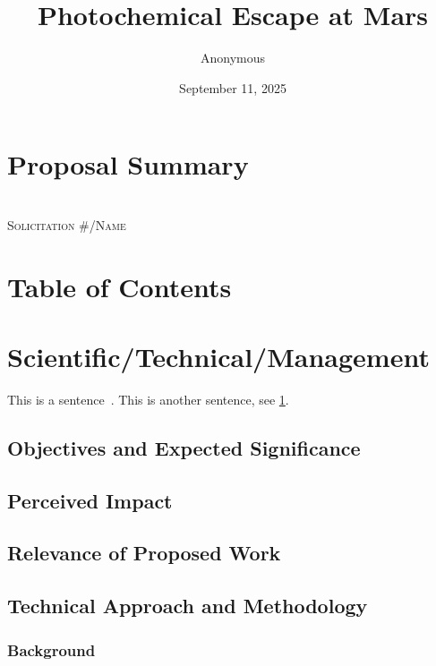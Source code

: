 \documentclass[oneside,12pt]{article}
\author{Anonymous}
\title{Photochemical Escape at Mars}
\date{September 11, 2025}
\makeatletter
\newcommand{\printtitle}{\@title}
\makeatother
\begin{document}
    \pagestyle{scrheadings}

    \section{Proposal Summary}
    \label{sec:summary}

    \clearpage

    \begin{center}
        \textsc{\textbf{\printtitle}\\
        \bigskip
        Solicitation \#/Name}
    \end{center}

    \section{Table of Contents}
    \renewcommand\contentsname{}
    \tableofcontents
    \thispagestyle{scrheadings}

    \clearpage

    \section{Scientific/Technical/Management}

    This is a sentence~\cite{Stone2022}. This is another sentence, see \cref{sec:summary}.

    \subsection{Objectives and Expected Significance}

    \subsection{Perceived Impact}

    \subsection{Relevance of Proposed Work}

    \subsection{Technical Approach and Methodology}

    \subsubsection{Background}
\end{document}
